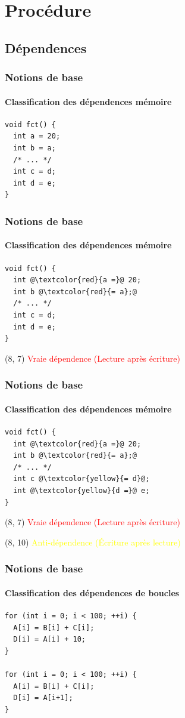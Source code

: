 \documentclass{beamer}
\begin{document}
\section{Procédure}
\subsection{Dépendences}
\begin{frame}[fragile]
\frametitle{Notions de base}
\framesubtitle{Classification des dépendences mémoire}
\begin{lstlisting}
void fct() {
  int a = 20;
  int b = a;
  /* ... */
  int c = d;
  int d = e;
}
\end{lstlisting}
\end{frame}

\begin{frame}[fragile]
\frametitle{Notions de base}
\framesubtitle{Classification des dépendences mémoire}
\begin{lstlisting}
void fct() {
  int @\textcolor{red}{a =}@ 20;
  int b @\textcolor{red}{= a};@
  /* ... */
  int c = d;
  int d = e;
}
\end{lstlisting}

\begin{textblock}{5}(8, 7)
	 \textcolor{red}{Vraie dépendence (Lecture après écriture)}
\end{textblock}
\end{frame}

\begin{frame}[fragile]
\frametitle{Notions de base}
\framesubtitle{Classification des dépendences mémoire}
\begin{lstlisting}
void fct() {
  int @\textcolor{red}{a =}@ 20;
  int b @\textcolor{red}{= a};@
  /* ... */
  int c @\textcolor{yellow}{= d}@;
  int @\textcolor{yellow}{d =}@ e;
}
\end{lstlisting}

\begin{textblock}{5}(8, 7)
	 \textcolor{red}{Vraie dépendence (Lecture après écriture)}
\end{textblock}

\begin{textblock}{5}(8, 10)
	\textcolor{yellow}{Anti-dépendence (Écriture après lecture)}
\end{textblock}
\end{frame}

\begin{frame}[fragile]
\frametitle{Notions de base}
\framesubtitle{Classification des dépendences de boucles}
\begin{lstlisting}
for (int i = 0; i < 100; ++i) {
  A[i] = B[i] + C[i];
  D[i] = A[i] + 10;
}

for (int i = 0; i < 100; ++i) {
  A[i] = B[i] + C[i];
  D[i] = A[i+1];
}
\end{lstlisting}
\end{frame}
\end{document}
